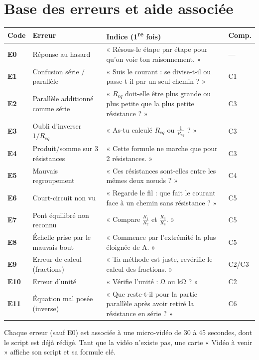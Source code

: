 \documentclass[11pt,a4paper]{report}
\newcommand{\req}{R_{eq}}
\begin{document}
\section{Base des erreurs et aide associée}
\begin{center}
\small
\begin{longtable}{>{\bfseries}l p{4.2cm} p{6.3cm} l}
  \toprule
  Code & Erreur & Indice (1\textsuperscript{re} fois) & Comp. \\
  \midrule
  \endhead
  E0 & Réponse au hasard & « Résous-le étape par étape pour qu'on voie ton raisonnement. » & — \\
  E1 & Confusion série / parallèle & « Suis le courant : se divise-t-il ou passe-t-il par un seul chemin ? » & C1 \\
  E2 & Parallèle additionné comme série & « $\req$ doit-elle être plus grande ou plus petite que la plus petite résistance ? » & C3 \\
  E3 & Oubli d'inverser $1/\req$ & « As-tu calculé $\req$ ou $\frac{1}{\req}$ ? » & C3 \\
  E4 & Produit/somme sur 3 résistances & « Cette formule ne marche que pour 2 résistances. » & C3 \\
  E5 & Mauvais regroupement & « Ces résistances sont-elles entre les mêmes deux nœuds ? » & C4 \\
  E6 & Court-circuit non vu & « Regarde le fil : que fait le courant face à un chemin sans résistance ? » & C5 \\
  E7 & Pont équilibré non reconnu & « Compare $\frac{R_1}{R_2}$ et $\frac{R_3}{R_4}$. » & C5 \\
  E8 & Échelle prise par le mauvais bout & « Commence par l'extrémité la plus éloignée de A. » & C5 \\
  E9 & Erreur de calcul (fractions) & « Ta méthode est juste, revérifie le calcul des fractions. » & C2/C3 \\
  E10 & Erreur d'unité & « Vérifie l'unité : \si{\ohm} ou \si{\kilo\ohm} ? » & C2 \\
  E11 & Équation mal posée (inverse) & « Que reste-t-il pour la partie parallèle après avoir retiré la résistance en série ? » & C6 \\
  \bottomrule
\end{longtable}
\end{center}
Chaque erreur (sauf E0) est associée à une micro-vidéo de 30 à 45 secondes, dont le script est déjà rédigé. Tant que la vidéo n'existe pas, une carte « Vidéo à venir » affiche son script et sa formule clé.
\end{document}

